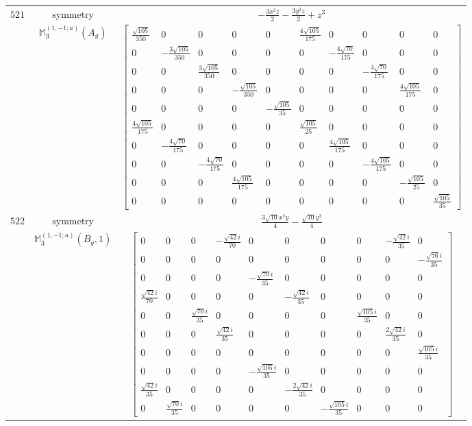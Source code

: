 \documentclass[fleqn,8pt,landscape]{jsarticle}
\begin{document}
\begin{longtable}{ccc}
$ 521 $ & $ \text{symmetry} $ & $ - \frac{3 x^{2} z}{2} - \frac{3 y^{2} z}{2} + z^{3} $ \\
$  $ & $ \mathbb{M}_{3}^{(1,-1;a)}(A_{g}) $ & $ \begin{bmatrix} \frac{\sqrt{105}}{350} & 0 & 0 & 0 & 0 & \frac{4 \sqrt{105}}{175} & 0 & 0 & 0 & 0 \\ 0 & - \frac{3 \sqrt{105}}{350} & 0 & 0 & 0 & 0 & - \frac{4 \sqrt{70}}{175} & 0 & 0 & 0 \\ 0 & 0 & \frac{3 \sqrt{105}}{350} & 0 & 0 & 0 & 0 & - \frac{4 \sqrt{70}}{175} & 0 & 0 \\ 0 & 0 & 0 & - \frac{\sqrt{105}}{350} & 0 & 0 & 0 & 0 & \frac{4 \sqrt{105}}{175} & 0 \\ 0 & 0 & 0 & 0 & - \frac{\sqrt{105}}{35} & 0 & 0 & 0 & 0 & 0 \\ \frac{4 \sqrt{105}}{175} & 0 & 0 & 0 & 0 & \frac{\sqrt{105}}{25} & 0 & 0 & 0 & 0 \\ 0 & - \frac{4 \sqrt{70}}{175} & 0 & 0 & 0 & 0 & \frac{4 \sqrt{105}}{175} & 0 & 0 & 0 \\ 0 & 0 & - \frac{4 \sqrt{70}}{175} & 0 & 0 & 0 & 0 & - \frac{4 \sqrt{105}}{175} & 0 & 0 \\ 0 & 0 & 0 & \frac{4 \sqrt{105}}{175} & 0 & 0 & 0 & 0 & - \frac{\sqrt{105}}{25} & 0 \\ 0 & 0 & 0 & 0 & 0 & 0 & 0 & 0 & 0 & \frac{\sqrt{105}}{35} \end{bmatrix} $ \\ \hline
$ 522 $ & $ \text{symmetry} $ & $ \frac{3 \sqrt{10} x^{2} y}{4} - \frac{\sqrt{10} y^{3}}{4} $ \\
$  $ & $ \mathbb{M}_{3}^{(1,-1;a)}(B_{g},1) $ & $ \begin{bmatrix} 0 & 0 & 0 & - \frac{\sqrt{42} i}{70} & 0 & 0 & 0 & 0 & - \frac{\sqrt{42} i}{35} & 0 \\ 0 & 0 & 0 & 0 & 0 & 0 & 0 & 0 & 0 & - \frac{\sqrt{70} i}{35} \\ 0 & 0 & 0 & 0 & - \frac{\sqrt{70} i}{35} & 0 & 0 & 0 & 0 & 0 \\ \frac{\sqrt{42} i}{70} & 0 & 0 & 0 & 0 & - \frac{\sqrt{42} i}{35} & 0 & 0 & 0 & 0 \\ 0 & 0 & \frac{\sqrt{70} i}{35} & 0 & 0 & 0 & 0 & \frac{\sqrt{105} i}{35} & 0 & 0 \\ 0 & 0 & 0 & \frac{\sqrt{42} i}{35} & 0 & 0 & 0 & 0 & \frac{2 \sqrt{42} i}{35} & 0 \\ 0 & 0 & 0 & 0 & 0 & 0 & 0 & 0 & 0 & \frac{\sqrt{105} i}{35} \\ 0 & 0 & 0 & 0 & - \frac{\sqrt{105} i}{35} & 0 & 0 & 0 & 0 & 0 \\ \frac{\sqrt{42} i}{35} & 0 & 0 & 0 & 0 & - \frac{2 \sqrt{42} i}{35} & 0 & 0 & 0 & 0 \\ 0 & \frac{\sqrt{70} i}{35} & 0 & 0 & 0 & 0 & - \frac{\sqrt{105} i}{35} & 0 & 0 & 0 \end{bmatrix} $ \\ \hline

\end{longtable}
\end{document}
